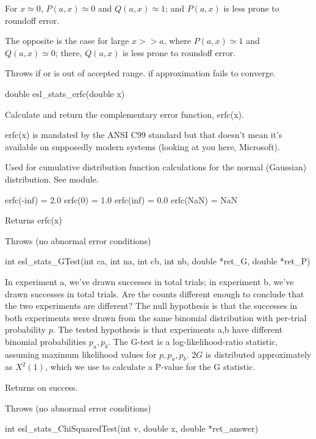 \begin{sreapi}
For $x \simeq 0$, $P(a,x) \simeq 0$ and $Q(a,x) \simeq 1$; and
$P(a,x)$ is less prone to roundoff error. 

The opposite is the case for large $x >> a$, where
$P(a,x) \simeq 1$ and $Q(a,x) \simeq 0$; there, $Q(a,x)$ is
less prone to roundoff error.

Throws  if  or  is out of accepted range.
 if approximation fails to converge.


\hypertarget{func:esl_stats_erfc()}
{\item[double esl\_stats\_erfc(double x)]}

Calculate and return the complementary error function, 
erfc(x).

erfc(x) is mandated by the ANSI C99 standard but that
doesn't mean it's available on supposedly modern systems
(looking at you here, Microsoft).

Used for cumulative distribution function calculations
for the normal (Gaussian) distribution. See 
module.

erfc(-inf) = 2.0
erfc(0)    = 1.0
erfc(inf)  = 0.0
erfc(NaN)  = NaN

Returns erfc(x)

Throws (no abnormal error conditions)



\hypertarget{func:esl_stats_GTest()}
{\item[int esl\_stats\_GTest(int ca, int na, int cb, int nb, double *ret\_G, double *ret\_P)]}

In experiment a, we've drawn  successes in  total
trials; in experiment b, we've drawn  successes in
 total trials. Are the counts different enough to
conclude that the two experiments are different? The
null hypothesis is that the successes in both experiments
were drawn from the same binomial distribution with
per-trial probability $p$. The tested hypothesis is that
experiments a,b have different binomial probabilities
$p_a,p_b$. The G-test is a log-likelihood-ratio statistic,
assuming maximum likelihood values for $p,p_a,p_b$. 
$2G$ is distributed approximately as $X^2(1)$,
which we use to calculate a P-value for the G statistic.

Returns  on success.

Throws (no abnormal error conditions)



\hypertarget{func:esl_stats_ChiSquaredTest()}
{\item[int esl\_stats\_ChiSquaredTest(int v, double x, double *ret\_answer)]}


\end{sreapi}
